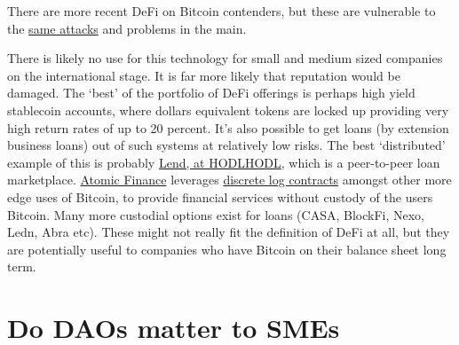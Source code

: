 There are more recent DeFi on Bitcoin contenders, but these are vulnerable to the \href{https://bisq.community/t/trading-halted-until-v1-3-0-hotfix/9208}{same attacks} and problems in the main. \par 
There is likely no use for this technology for small and medium sized companies on the international stage. It is far more likely that reputation would be damaged. The `best' of the portfolio of DeFi offerings is perhaps high yield stablecoin accounts, where dollars equivalent tokens are locked up providing very high return rates of up to 20 percent. It's also possible to get loans (by extension business loans) out of such systems at relatively low risks. The best `distributed' example of this is probably \href{https://lend.hodlhodl.com/}{Lend, at HODLHODL}, which is a peer-to-peer loan marketplace. \href{https://atomic.finance/blog/a-laypersons-guide-to-discreet-log-contracts-atomic-yield-series-part-3/}{Atomic Finance} leverages \href{https://adiabat.github.io/dlc.pdf}{discrete log contracts} amongst other more edge uses of Bitcoin, to provide financial services without custody of the users Bitcoin. Many more custodial options exist for loans (CASA, BlockFi, Nexo, Ledn, Abra etc). These might not really fit the definition of DeFi at all, but they are potentially useful to companies who have Bitcoin on their balance sheet long term.

\section{Do DAOs matter to SMEs}

